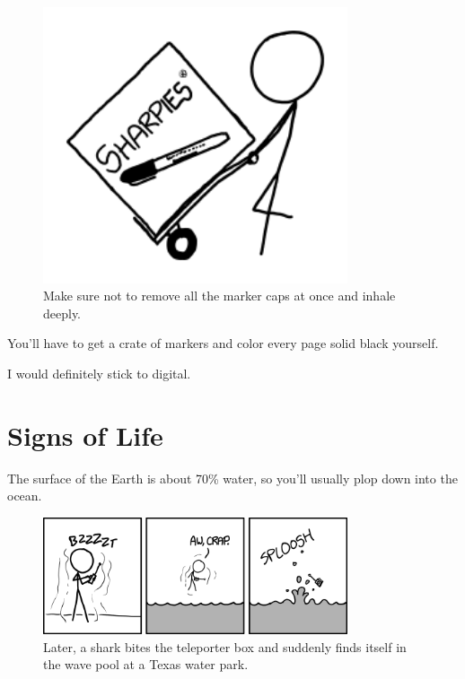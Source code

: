 {\begin{figure}[!htbp]
\centering
\includegraphics[scale=0.5, max width=0.8\textwidth]{imgs/a/59/wiki_sharpies.png}
\caption{Make sure not to remove all the marker caps at once and inhale deeply.}
\end{figure}

{You'll have to get a crate of markers and color every page solid black yourself.}

{I would definitely stick to digital.}

{
\chapter{Signs of Life}
}

\hfill{}

{The surface of the Earth is about 70\% water, so you'll usually plop down into the ocean.}

\begin{figure}[!htbp]
\centering
\includegraphics[scale=0.5, max width=0.8\textwidth]{imgs/a/60/sample_sploosh.png}
\caption{Later, a shark bites the teleporter box and suddenly finds itself in the wave pool at a Texas water park.}
\end{figure}

}
